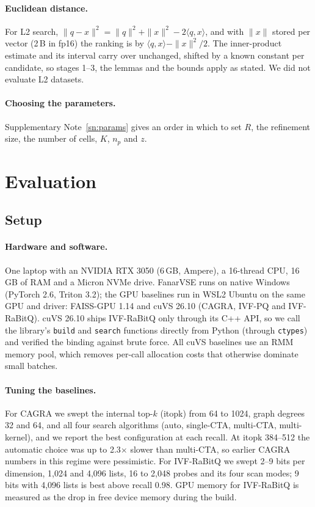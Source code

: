 \documentclass[fleqn,10pt]{wlscirep}
\begin{document}
\paragraph{Euclidean distance.} For L2 search, $\|q-x\|^2=\|q\|^2+\|x\|^2-2\langle q,x\rangle$, and with $\|x\|$ stored per vector (2\,B in fp16) the ranking is by $\langle q,x\rangle-\|x\|^2/2$. The inner-product estimate and its interval carry over unchanged, shifted by a known constant per candidate, so stages 1--3, the lemmas and the bounds apply as stated. We did not evaluate L2 datasets.

\paragraph{Choosing the parameters.} Supplementary Note~\ref{sn:params} gives an order in which to set $R$, the refinement size, the number of cells, $K$, $n_p$ and $z$.

\section{Evaluation}\label{sec:eval}
\subsection{Setup}
\paragraph{Hardware and software.} One laptop with an NVIDIA RTX 3050 (6\,GB, Ampere), a 16-thread CPU, 16\,GB of RAM and a Micron NVMe drive. FanarVSE runs on native Windows (PyTorch 2.6, Triton 3.2); the GPU baselines run in WSL2 Ubuntu on the same GPU and driver: FAISS-GPU 1.14 and cuVS 26.10 (CAGRA, IVF-PQ and IVF-RaBitQ). cuVS 26.10 ships IVF-RaBitQ only through its C++ API, so we call the library's \texttt{build} and \texttt{search} functions directly from Python (through \texttt{ctypes}) and verified the binding against brute force. All cuVS baselines use an RMM memory pool, which removes per-call allocation costs that otherwise dominate small batches.

\paragraph{Tuning the baselines.} For CAGRA we swept the internal top-$k$ (itopk) from 64 to 1024, graph degrees 32 and 64, and all four search algorithms (auto, single-CTA, multi-CTA, multi-kernel), and we report the best configuration at each recall. At itopk 384--512 the automatic choice was up to 2.3$\times$ slower than multi-CTA, so earlier CAGRA numbers in this regime were pessimistic. For IVF-RaBitQ we swept 2--9 bits per dimension, 1{,}024 and 4{,}096 lists, 16 to 2{,}048 probes and its four scan modes; 9 bits with 4{,}096 lists is best above recall 0.98. GPU memory for IVF-RaBitQ is measured as the drop in free device memory during the build.
\end{document}

